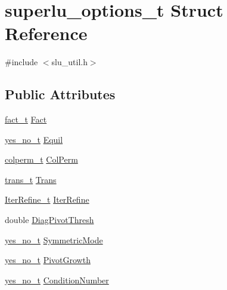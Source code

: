 \hypertarget{structsuperlu__options__t}{}\section{superlu\+\_\+options\+\_\+t Struct Reference}
\label{structsuperlu__options__t}


{\ttfamily \#include $<$slu\+\_\+util.\+h$>$}

\subsection*{Public Attributes}
\begin{DoxyCompactItemize}
\item 
\hyperlink{superlu__enum__consts_8h_ac785c8235480e5cfef9848d89c047c0a}{fact\+\_\+t} \hyperlink{structsuperlu__options__t_acbd3cc1d27bbaf5bc168ebbbd6bf60fe}{Fact}
\item 
\hyperlink{superlu__enum__consts_8h_ae6553118ce91b9c08f9376941ae1536f}{yes\+\_\+no\+\_\+t} \hyperlink{structsuperlu__options__t_a3fe998e3518ad90532072fa8929a1e2f}{Equil}
\item 
\hyperlink{superlu__enum__consts_8h_abd17bbb14f57694750d96639e738e89c}{colperm\+\_\+t} \hyperlink{structsuperlu__options__t_af6e41a7d8ca989c5396f6edc67be0409}{Col\+Perm}
\item 
\hyperlink{superlu__enum__consts_8h_a0c4e17b2d5cea33f9991ccc6a6678d62}{trans\+\_\+t} \hyperlink{structsuperlu__options__t_a23fa8259c7091d82f10f0dfc7718dc36}{Trans}
\item 
\hyperlink{superlu__enum__consts_8h_a7e73e9d3a9caeec3586c03e01c494e37}{Iter\+Refine\+\_\+t} \hyperlink{structsuperlu__options__t_a3e40fb39641e0caf27feb6998d21d98a}{Iter\+Refine}
\item 
double \hyperlink{structsuperlu__options__t_ae574f08a3f4094dae8f635690b71d944}{Diag\+Pivot\+Thresh}
\item 
\hyperlink{superlu__enum__consts_8h_ae6553118ce91b9c08f9376941ae1536f}{yes\+\_\+no\+\_\+t} \hyperlink{structsuperlu__options__t_aad1b52d0366ae8601e97fab5c470c45d}{Symmetric\+Mode}
\item 
\hyperlink{superlu__enum__consts_8h_ae6553118ce91b9c08f9376941ae1536f}{yes\+\_\+no\+\_\+t} \hyperlink{structsuperlu__options__t_aa75cfd534f156c78b7dc69e7e68596da}{Pivot\+Growth}
\item 
\hyperlink{superlu__enum__consts_8h_ae6553118ce91b9c08f9376941ae1536f}{yes\+\_\+no\+\_\+t} \hyperlink{structsuperlu__options__t_a3394d6658ec588071a9fee24a728eb07}{Condition\+Number}

\end{DoxyCompactItemize}

